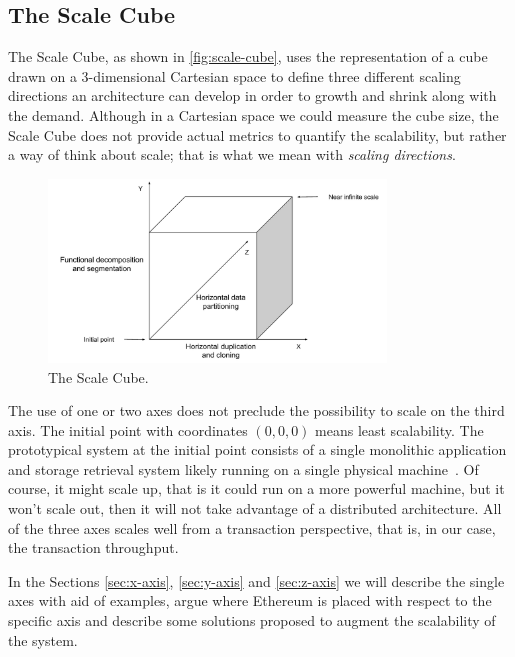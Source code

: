 \subsection{The Scale Cube}
\label{sec:scale-cube}

The Scale Cube, as shown in \autoref{fig:scale-cube}, uses the representation of
a cube drawn on a 3-dimensional Cartesian space to define three different
scaling directions an architecture can develop in order to growth and shrink
along with the demand. Although in a Cartesian space we could measure the cube
size, the Scale Cube does not provide actual metrics to quantify the
scalability, but rather a way of think about scale; that is what we mean with
\emph{scaling directions}.

\begin{figure}[h]
	\begin{center}
		\includegraphics[width=0.8\textwidth]{./res/img/scale-cube.pdf}
	\end{center}
	\caption{The Scale Cube.}
	\label{fig:scale-cube}
\end{figure}

The use of one or two axes does not preclude the possibility to scale on the
third axis. The initial point with coordinates $(0,0,0)$ means least
scalability. The prototypical system at the initial point consists of a single
monolithic application and storage retrieval system likely running on a single
physical machine~\cite{bib:art-of-scalability}. Of course, it might scale up,
that is it could run on a more powerful machine, but it won't scale out, then it
will not take advantage of a distributed architecture. All of the three axes
scales well from a transaction perspective, that is, in our case, the
transaction throughput. 

In the Sections \ref{sec:x-axis}, \ref{sec:y-axis} and \ref{sec:z-axis} we will
describe the single axes with aid of examples, argue where Ethereum is placed 
with respect to the specific axis and describe some solutions proposed to 
augment the scalability of the system.
